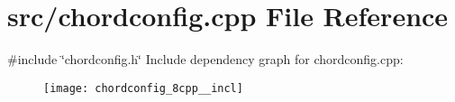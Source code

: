 \section{src/chordconfig.cpp File Reference}
\label{chordconfig_8cpp}
{\ttfamily \#include \char`\"{}chordconfig.\+h\char`\"{}}\newline
Include dependency graph for chordconfig.\+cpp\+:\nopagebreak
\begin{figure}[H]
\begin{center}
\leavevmode
\texttt{[image: chordconfig\_8cpp\_\_incl]}
\end{center}
\end{figure}
